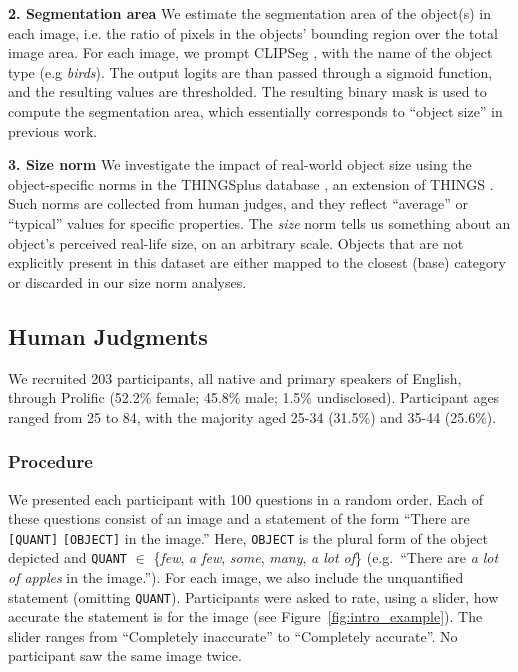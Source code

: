 \noindent
{\bf 2. Segmentation area} We estimate the segmentation area of the object(s) in each image, i.e. the ratio of pixels in the objects' bounding region over the total image area. For each image, we prompt CLIPSeg \citep{luddecke2022-clipseg}, with the name of the object type (e.g \textit{birds}). The output logits are than passed through a sigmoid function, and the resulting values are thresholded. The resulting binary mask is used to compute the segmentation area, which essentially corresponds to ``object size'' in previous work.

\noindent 
{\bf 3. Size norm}
We investigate the impact of real-world object size using the object-specific norms in the THINGSplus database \citep{stoinski2024-thingsplus}, an extension of THINGS \citep{hebart2019-things}. Such norms are collected from human judges, and they reflect ``average'' or ``typical'' values for specific properties. The \emph{size} 
norm tells us something about an object's perceived real-life size, on an arbitrary scale. 
Objects that are not explicitly present in this dataset are either mapped to the closest (base) category or discarded in our size norm analyses. 

\subsection{Human Judgments}\label{sec:dataset_humans}
We recruited 203 participants, all native and primary speakers of English, through Prolific (52.2\% female; 45.8\% male; 1.5\% undisclosed). Participant ages ranged from 25 to 84, with the majority aged 25-34 (31.5\%) and 35-44 (25.6\%). 

\subsubsection{Procedure}
We presented each participant with 100 questions in a random order. 
Each of these questions consist of an image and a statement of the form ``There are \verb|[QUANT]| \verb|[OBJECT]| in the image.'' 
Here, \verb|OBJECT| is the plural form of the object depicted and
\verb|QUANT| $\in$ \{\textit{few}, \textit{a few}, \textit{some}, \textit{many}, \textit{a lot of}\} (e.g.\ ``There are \textit{a lot of apples} in the image.''). For each image, we also include the unquantified statement (omitting \verb|QUANT|).
Participants were asked to rate, using a slider, how accurate the statement is for the image (see Figure~\ref{fig:intro_example}). The slider ranges from ``Completely inaccurate'' to ``Completely accurate''. 
No participant saw the same image twice. 

